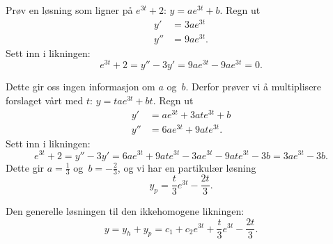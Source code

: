 \documentclass[notitlepage,a4paper,12pt,norsk]{IMFeksamen}
\newcommand{\0}{\V{0}}
\newcommand{\oppgslutt}{
\begin{center}
\pgfornament[width=6cm]{88}
\end{center}
}
\newenvironment{losning}{\begin{oppgave}}{\oppgslutt\end{oppgave}}
\begin{document}
\begin{losning}
Prøv en løsning som ligner på $e^{3t}+2$: $y=ae^{3t}+b$. Regn ut 
\begin{align*}
y'&=3ae^{3t}\\
y''&=9ae^{3t}.
\end{align*}
Sett inn i likningen:
\[
e^{3t}+2=y''-3y'=9ae^{3t}-9ae^{3t}=0.
\]

Dette gir oss ingen informasjon om $a$ og~$b$. Derfor prøver vi å multiplisere forslaget vårt med $t$: $y=tae^{3t}+bt$. Regn ut
\begin{align*}
y'&=ae^{3t}+3ate^{3t}+b\\
y''&=6ae^{3t}+9ate^{3t}.
\end{align*}
Sett inn i likningen:
\[
e^{3t}+2=y''-3y'=6ae^{3t}+9ate^{3t}-3ae^{3t}-9ate^{3t}-3b=3ae^{3t}-3b.
\]
Dette gir $a=\frac{1}{3}$ og~$b=-\frac{2}{3}$, og vi har en partikulær løsning
\[
y_p=\frac{t}{3}e^{3t}-\frac{2t}{3}.
\]


Den generelle løsningen til den ikkehomogene likningen:
\[
y=y_h+y_p=c_1+c_2e^{3t}+\frac{t}{3}e^{3t}-\frac{2t}{3}.
\]

\end{losning}
\end{document}
